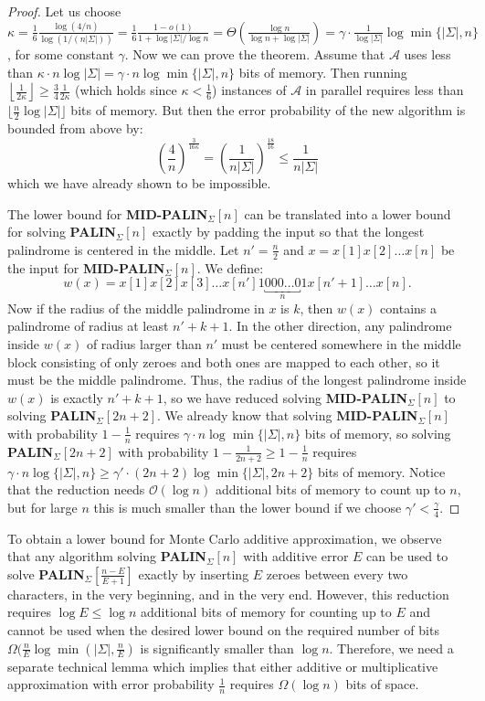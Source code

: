 \documentclass{article}[11pt,letter]
\newcommand{\bigo}{\mathcal{O}}
\newcommand{\alg}{\mathcal{A}}
\newcommand{\midpalin}[1][n]{{\bf MID-PALIN}$_{\Sigma}[#1]$\xspace}
\newcommand{\palin}[1][n]{{\bf PALIN}$_{\Sigma}[#1]$\xspace}
\newcommand{\aerr}{\ensuremath{E}}
\begin{document}
\begin{proof}
Let us choose $\kappa = \frac{1}{6}\frac{\log(4/n)}{\log(1/(n|\Sigma|))} = \frac16 \frac{1-o(1)}{1+\log|\Sigma|/\log n} = \Theta(\frac{\log n}{\log n + \log |\Sigma|}) = \gamma \cdot \frac{1}{\log |\Sigma|} \log \min \{|\Sigma|, n\}$, for some constant $\gamma$.
Now we can prove the theorem. Assume that $\alg$ uses less than $\kappa \cdot n\log |\Sigma| = \gamma \cdot n \log \min  \{|\Sigma|, n\}$ bits of memory. Then running $\left\lfloor \frac{1}{2\kappa} \right\rfloor \ge \frac34\frac1{2\kappa}$ (which holds since $\kappa < \frac16$)
instances of $\alg$ in parallel requires less than $\lfloor \frac{n}{2} \log |\Sigma| \rfloor$ bits of memory. But then 
the error probability of the new algorithm is bounded from above by:
\[\left(\frac{4}{n}\right)^{\frac{3}{16\kappa}} = \left(\frac{1}{n|\Sigma|}\right)^{\frac{18}{16}} \le \frac{1}{n|\Sigma|}\]
which we have already shown to be impossible.

The lower bound for \midpalin can be translated into a lower bound for solving \palin exactly
by padding the input so that the longest palindrome is centered in the middle.
Let $n'=\frac{n}{2}$ and
$x=x[1]x[2]\ldots x[n]$ be the input for \midpalin. We define:
\[w(x)= x[1] x[2] x[3]  \ldots x[n']  1 \underbracket{000 \ldots 0}_{n} 1 x[n'+1] \ldots x[n].\]
Now if the radius of the middle palindrome in $x$ is $k$, then $w(x)$ contains a palindrome of radius
at least $n'+k+1$. In the other direction, any palindrome inside $w(x)$ of radius larger than $n'$ must be centered somewhere
in the middle block consisting of only zeroes and both ones are mapped to each other, so it must be
the middle palindrome.
Thus, the radius of the longest palindrome inside $w(x)$ is exactly $n'+k+1$, so we have reduced solving \midpalin to solving
\palin[2n+2]. We already know that solving \midpalin[n] with probability $1-\frac{1}{n}$
requires $\gamma \cdot n \log \min \{|\Sigma|, n\}$ bits of memory,
so solving \palin[2n+2] with probability $1-\frac{1}{2n+2}\geq 1-\frac{1}{n}$ requires $\gamma \cdot n \log \{|\Sigma|,n\} \geq \gamma' \cdot (2n+2) \log \min \{|\Sigma|, 2n+2\}$ bits of memory.
Notice that the reduction needs $\bigo(\log n)$ additional bits of memory to count up to $n$, but for large $n$ this is
much smaller than the lower bound if we choose $\gamma' < \frac{\gamma}{4}$.
\end{proof}


To obtain a lower bound for Monte Carlo additive approximation, we observe that any algorithm
solving \palin with additive error $\aerr$ can be used to solve \palin[\frac{n-\aerr}{\aerr+1}] exactly
by inserting $\aerr$ zeroes between every two characters, in the very beginning, and in the very end.
However, this reduction requires $\log \aerr\leq \log n$ additional bits of memory for counting up to $\aerr$
and cannot be used when the desired lower bound on the required number of bits
$\Omega(\frac{n}{\aerr}\log\min(|\Sigma|,\frac{n}{E})$ is significantly smaller than $\log n$. 
Therefore, we need a separate technical lemma which implies that either additive or multiplicative
approximation with error probability $\frac{1}{n}$ requires $\Omega(\log n)$ bits of space.
\end{document}
